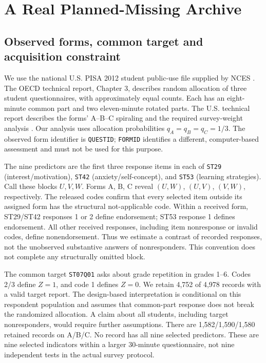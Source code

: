 \section{A Real Planned-Missing Archive}\label{app:pisa}

\subsection{Observed forms, common target and acquisition constraint}
We use the national U.S. PISA 2012 student public-use file supplied by NCES
\citep{pisaus2014}. The OECD technical report, Chapter 3, describes random
allocation of three student questionnaires, with approximately equal
counts. Each has an eight-minute common part and two eleven-minute rotated
parts. The U.S. technical report describes the forms' A--B--C spiraling
and the required survey-weight analysis \citep{pisa2014,kastberg2014}.
Our analysis uses allocation probabilities $q_A=q_B=q_C=1/3$. The observed
form identifier is \texttt{QUESTID}; \texttt{FORMID} identifies a different,
computer-based assessment and must not be used for this purpose.

The nine predictors are the first three response items in each of
\texttt{ST29} (interest/motivation), \texttt{ST42} (anxiety/self-concept),
and \texttt{ST53} (learning strategies). Call these blocks $U,V,W$.
Forms A, B, C reveal $(U,W)$, $(U,V)$, $(V,W)$, respectively. The released
codes confirm that every selected item outside its assigned form has the
structural not-applicable code. Within a received form, ST29/ST42 responses
1 or 2 define endorsement; ST53 response 1 defines endorsement. All other
received responses, including item nonresponse or invalid codes, define
nonendorsement. Thus we estimate a contrast of recorded responses, not
the unobserved substantive answers of nonresponders. This convention does
not complete any structurally omitted block.

The common target \texttt{ST07Q01} asks about grade repetition in grades
1--6. Codes 2/3 define $Z=1$, and code 1 defines $Z=0$. We retain 4,752 of
4,978 records with a valid target report. The design-based interpretation
is conditional on this respondent population and assumes that common-part
response does not break the randomized allocation. A claim about all
students, including target nonresponders, would require further assumptions.
There are 1,582/1,590/1,580 retained records on A/B/C. No record has all
nine selected predictors. These are nine selected indicators within a
larger 30-minute questionnaire, not nine independent tests in the actual
survey protocol.

